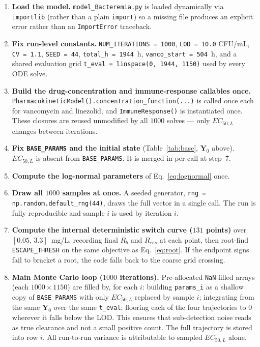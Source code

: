 \documentclass[11pt]{article}
\begin{document}
\begin{enumerate}
\item \textbf{Load the model.} \texttt{model\_Bacteremia.py} is loaded
dynamically via \texttt{importlib} (rather than a plain \texttt{import}) so
a missing file produces an explicit error rather than an
\texttt{ImportError} traceback.

\item \textbf{Fix run-level constants.} \texttt{NUM\_ITERATIONS = 1000},
\texttt{LOD = 10.0} CFU/mL, \texttt{CV = 1.1}, \texttt{SEED = 44},
\texttt{total\_h = 1944}~h, \texttt{vanco\_start = 504}~h, and a shared
evaluation grid \texttt{t\_eval = linspace(0, 1944, 1150)} used by every
ODE solve.

\item \textbf{Build the drug-concentration and immune-response callables
once.} \texttt{PharmacokineticModel().concentration\_function(...)} is
called once each for vancomycin and linezolid, and
\texttt{ImmuneResponse()} is instantiated once. These closures are reused
unmodified by all $1000$ solves --- only $EC_{50,L}$ changes between
iterations.

\item \textbf{Fix \texttt{BASE\_PARAMS} and the initial state}
(Table~\ref{tab:base}, $\mathbf{Y}_0$ above). $EC_{50,L}$ is 
absent from \texttt{BASE\_PARAMS}.  It is merged in per call at step~7.

\item \textbf{Compute the log-normal parameters} of
Eq.~\eqref{eq:lognormal} once.

\item \textbf{Draw all $1000$ samples at once.} A seeded generator,
\texttt{rng = np.random.default\_rng(44)}, draws the full vector in a
single call.  The run is fully reproducible and sample $i$ is used by
iteration $i$.

\item \textbf{Compute the internal deterministic switch curve
($131$ points)} over $[0.05,\,3.3]$~mg/L, recording final $R_b$ and
$R_{res}$ at each point, then root-find \texttt{ESCAPE\_THRESH} on the same
objective as Eq.~\eqref{eq:root}. If the endpoint signs fail to bracket a
root, the code falls back to the coarse grid crossing.

\item \textbf{Main Monte Carlo loop ($1000$ iterations).} Pre-allocated
\texttt{NaN}-filled arrays (each $1000 \times 1150$) are filled by, for
each $i$: building \texttt{params\_i} as a shallow copy of
\texttt{BASE\_PARAMS} with only $EC_{50,L}$ replaced by sample $i$;
integrating from the same $\mathbf{Y}_0$ over the same \texttt{t\_eval};
flooring each of the four trajectories to $0$ wherever it falls below the
LOD. This ensures that sub-detection noise reads as true clearance and not a small positive count.  The full trajectory is stored into row $i$. All run-to-run
variance is attributable to sampled $EC_{50,L}$ alone. 


\end{enumerate}
\end{document}
